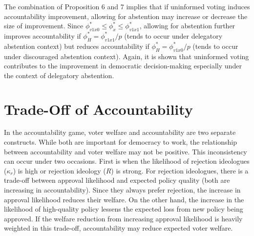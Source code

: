 \documentclass[letterpaper, 12pt]{article}
\begin{document}
    \noindent The combination of Proposition 6 and 7 implies that if uninformed voting induces accountability improvement, allowing for abstention may increase or decrease the size of improvement. Since $\phi^*_{v1x0} \leq \phi^*_x \leq  \phi^*_{v1x1}$, allowing for abstention further improves accountability if $\phi^*_H=\phi^*_{v1x1}/p$ (tends to occur under delegatory abstention context) but reduces accountability if $\phi^*_H=\phi^*_{v1x0}/p$ (tends to occur under discouraged abstention context). Again, it is shown that uninformed voting contributes to the improvement in democratic decision-making especially under the context of delegatory abstention.
    
    \section*{Trade-Off of Accountability}

    \par In the accountability game, voter welfare and accountability are two separate constructs. While both are important for democracy to work, the relationship between accountability and voter welfare may not be positive. This inconsistency can occur under two occasions. First is when the likelihood of rejection ideologues ($\kappa_r$) is high or rejection ideology ($R$) is strong. For rejection ideologues, there is a trade-off between approval likelihood and expected policy quality (both are increasing in accountability). Since they always prefer rejection, the increase in approval likelihood reduces their welfare. On the other hand, the increase in the likelihood of high-quality policy lessens the expected loss from new policy being approved. If the welfare reduction from increasing approval likelihood is heavily weighted in this trade-off, accountability may reduce expected voter welfare.
\end{document}
